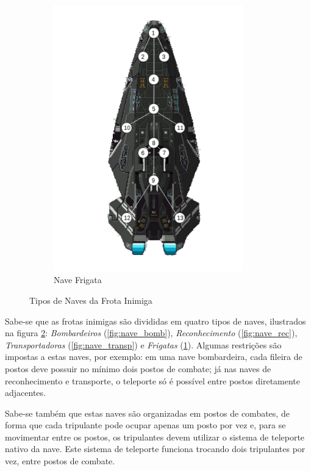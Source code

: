 \begin{figure}[ht]
\begin{subfigure}[b]{0.24\textwidth}
		\includegraphics[width=0.9\textwidth]{imgs/frig.png}
		\caption{Nave Frigata}
		\label{fig:nave_frig}
	\end{subfigure}
	\caption{Tipos de Naves da Frota Inimiga}
	\label{fig:naves_tipos}
\end{figure}


Sabe-se que as frotas inimigas são divididas em quatro tipos de naves, ilustrados na figura \ref{fig:naves_tipos}: \textit{Bombardeiros} (\ref{fig:nave_bomb}),  \textit{Reconhecimento} (\ref{fig:nave_rec}),  \textit{Transportadoras} (\ref{fig:nave_transp}) e \textit{Frigatas} (\ref{fig:nave_frig}). Algumas restrições são impostas a estas naves, por exemplo: em uma nave bombardeira, cada fileira de postos deve possuir no mínimo dois postos de combate; já nas naves de reconhecimento e transporte, o teleporte só é possível entre postos diretamente adjacentes.

Sabe-se também que estas naves são organizadas em postos de combates, de forma que cada tripulante pode ocupar apenas um posto por vez e, para se movimentar entre os postos, os tripulantes devem utilizar o sistema de teleporte nativo da nave. Este sistema de teleporte funciona trocando dois tripulantes por vez, entre postos de combate.

